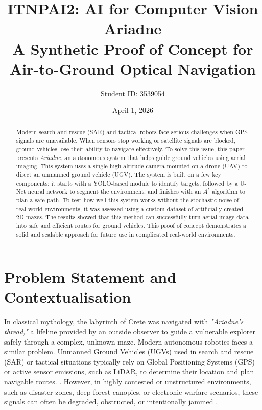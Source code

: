 \documentclass[12pt, a4paper]{article}
\title{
    \Large \textbf{ITNPAI2: AI for Computer Vision} \\
    \vspace{0.5cm}
    \LARGE \textbf{Ariadne} \\
    \vspace{0.25cm}
    \large A Synthetic Proof of Concept for Air-to-Ground Optical Navigation
}
\author{Student ID: 3539054}
\date{April 1, 2026}
\begin{document}
\maketitle

\vspace{1cm}

\begin{abstract}
Modern search and rescue (SAR) and tactical robots face serious challenges when GPS signals are unavailable. When sensors stop working or satellite signals are blocked, ground vehicles lose their ability to navigate effectively. To solve this issue, this paper presents \textit{Ariadne}, an autonomous system that helps guide ground vehicles using aerial imaging. This system uses a single high-altitude camera mounted on a drone (UAV) to direct an unmanned ground vehicle (UGV). The system is built on a few key components: it starts with a YOLO-based module to identify targets, followed by a U-Net neural network to segment the environment, and finishes with an $A^*$ algorithm to plan a safe path. To test how well this system works without the stochastic noise of real-world environments, it was assessed using a custom dataset of artificially created 2D mazes. The results showed that this method can successfully turn aerial image data into safe and efficient routes for ground vehicles. This proof of concept demonstrates a solid and scalable approach for future use in complicated real-world environments.
\end{abstract}

\newpage

\section{Problem Statement and Contextualisation}

\quad In classical mythology, the labyrinth of Crete was navigated with \textit{"Ariadne’s thread,"} a lifeline provided by an outside observer to guide a vulnerable explorer safely through a complex, unknown maze. Modern autonomous robotics faces a similar problem. Unmanned Ground Vehicles (UGVs) used in search and rescue (SAR) or tactical situations typically rely on Global Positioning Systems (GPS) or active sensor emissions, such as LiDAR, to determine their location and plan navigable routes. \cite{11219502}. However, in highly contested or unstructured environments, such as disaster zones, deep forest canopies, or electronic warfare scenarios, these signals can often be degraded, obstructed, or intentionally jammed \cite{8741612}.
\end{document}
